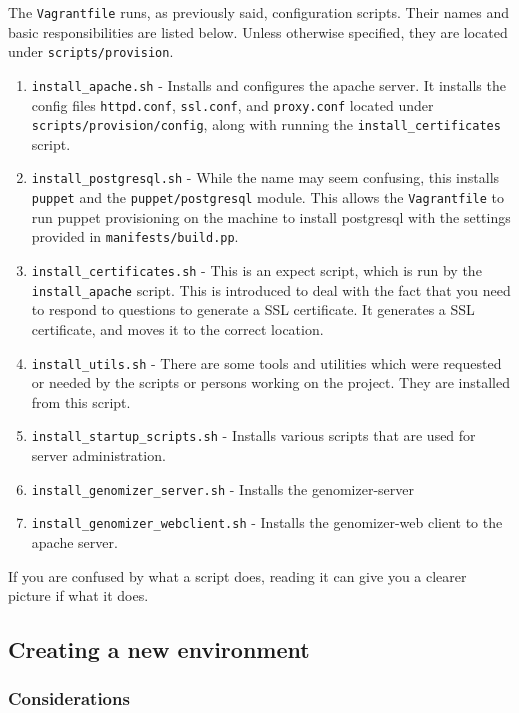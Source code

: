 The \texttt{Vagrantfile} runs, as previously said, configuration
scripts. Their names and basic responsibilities are listed below. Unless
otherwise specified, they are located under \texttt{scripts/provision}.

\begin{enumerate}
\itemsep1pt\parskip0pt
\item
  \texttt{install\_apache.sh} - Installs and configures the apache
  server. It installs the config files \texttt{httpd.conf},
  \texttt{ssl.conf}, and \texttt{proxy.conf} located under
  \texttt{scripts/provision/config}, along with running the
  \texttt{install\_certificates} script.
\item
  \texttt{install\_postgresql.sh} - While the name may seem confusing,
  this installs \texttt{puppet} and the \texttt{puppet/postgresql}
  module. This allows the \texttt{Vagrantfile} to run puppet
  provisioning on the machine to install postgresql with the settings
  provided in \texttt{manifests/build.pp}.
\item
  \texttt{install\_certificates.sh} - This is an expect script, which is
  run by the \texttt{install\_apache} script. This is introduced to deal
  with the fact that you need to respond to questions to generate a SSL
  certificate. It generates a SSL certificate, and moves it to the
  correct location.
\item
  \texttt{install\_utils.sh} - There are some tools and utilities which
  were requested or needed by the scripts or persons working on the
  project. They are installed from this script.
\item
  \texttt{install\_startup\_scripts.sh} - Installs various scripts that
  are used for server administration.
\item
  \texttt{install\_genomizer\_server.sh} - Installs the genomizer-server
\item
  \texttt{install\_genomizer\_webclient.sh} - Installs the genomizer-web
  client to the apache server.
\end{enumerate}

If you are confused by what a script does, reading it can give you a
clearer picture if what it does.

\subsection{Creating a new
environment}\label{creating-a-new-environment}

\subsubsection{Considerations}\label{considerations}

